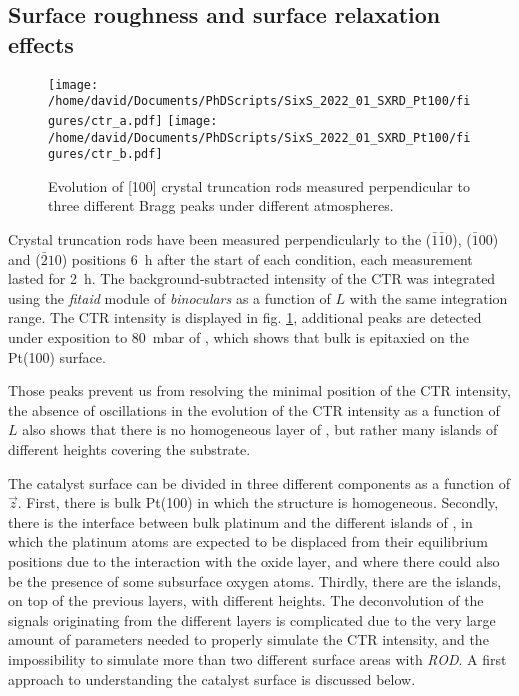 \subsection{Surface roughness and surface relaxation effects}

\begin{figure}[!htb]
    \centering
    \texttt{[image: /home/david/Documents/PhDScripts/SixS\_2022\_01\_SXRD\_Pt100/figures/ctr\_a.pdf]}
    \texttt{[image: /home/david/Documents/PhDScripts/SixS\_2022\_01\_SXRD\_Pt100/figures/ctr\_b.pdf]}
    \caption{
        Evolution of [100] crystal truncation rods measured perpendicular to three different Bragg peaks under different atmospheres.
    }
    \label{fig:CTRPt100}
\end{figure}

Crystal truncation rods have been measured perpendicularly to the ($\bar{1}\bar{1}0$), ($\bar{1}00$) and ($\bar{2}10$) positions \qty{6}{\hour} after the start of each condition, each measurement lasted for \qty{2}{\hour}.
The background-subtracted intensity of the CTR was integrated using the \textit{fitaid} module of \textit{binoculars} as a function of $L$ with the same integration range.
The CTR intensity is displayed in fig. \ref{fig:CTRPt100}, additional peaks are detected under exposition to \qty{80}{\milli\bar} of , which shows that bulk  is epitaxied on the Pt(100) surface.

Those peaks prevent us from resolving the minimal position of the CTR intensity, the absence of oscillations in the evolution of the CTR intensity as a function of $L$ also shows that there is no homogeneous layer of , but rather many islands of different heights covering the substrate.

The catalyst surface can be divided in three different components as a function of $\vec{z}$.
First, there is bulk Pt(100) in which the structure is homogeneous.
Secondly, there is the interface between bulk platinum and the different islands of , in which the platinum atoms are expected to be displaced from their equilibrium positions due to the interaction with the oxide layer, and where there could also be the presence of some subsurface oxygen atoms.
Thirdly, there are the  islands, on top of the previous layers, with different heights.
The deconvolution of the signals originating from the different layers is complicated due to the very large amount of parameters needed to properly simulate the CTR intensity, and the impossibility to simulate more than two different surface areas with \textit{ROD}.
A first approach to understanding the catalyst surface is discussed below.

